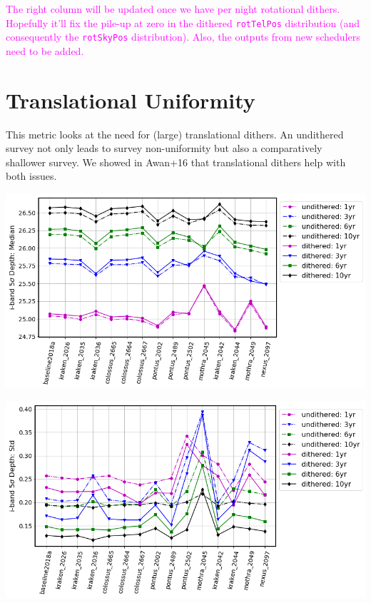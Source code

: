 \documentclass[a4paper,10pt]{article}
\newcommand{\ttt}[1]{\texttt{#1}}
\newcommand{\cl}[1]{\textcolor{magenta}{#1}}
\begin{document}
\cl{The right column will be updated once we have per night rotational dithers. Hopefully it'll fix the pile-up at zero in the dithered \ttt{rotTelPos} distribution (and consequently the \ttt{rotSkyPos} distribution). Also, the outputs from new schedulers need to be added.}

\newpage
\section*{Translational Uniformity\label{translational dithers}}
This metric looks at the need for (large) translational dithers. An undithered survey not only leads to survey non-uniformity but also a comparatively shallower survey. We showed in Awan+16 that translational dithers help with both issues.

\begin{minipage}{\columnwidth}
\vspace*{2em}
\centering
\includegraphics[width=.75\columnwidth]{lss_compare_depth_median_15dbs_undith.png}
\vspace*{2em}
\end{minipage}

\begin{minipage}{\columnwidth}
\vspace*{2em}
\centering
\includegraphics[width=.75\columnwidth]{lss_compare_depth_std_15dbs_undith.png}
\vspace*{2em}
\end{minipage}
\end{document}
